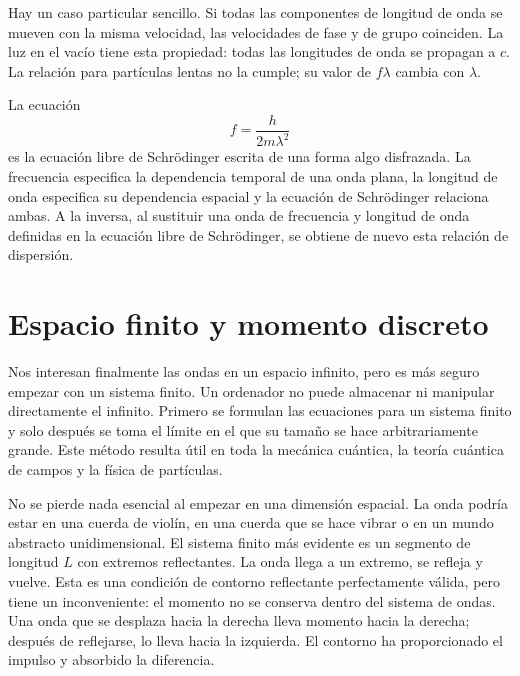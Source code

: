 Hay un caso particular sencillo. Si todas las componentes de longitud de onda se mueven con la misma velocidad, las velocidades de fase y de grupo coinciden. La luz en el vacío tiene esta propiedad: todas las longitudes de onda se propagan a \(c\). La relación para partículas lentas no la cumple; su valor de \(f\lambda\) cambia con \(\lambda\).

La ecuación
\begin{equation}
f=\frac{h}{2m\lambda^2}
\end{equation}
es la ecuación libre de Schr\"odinger escrita de una forma algo disfrazada. La frecuencia especifica la dependencia temporal de una onda plana, la longitud de onda especifica su dependencia espacial y la ecuación de Schr\"odinger relaciona ambas. A la inversa, al sustituir una onda de frecuencia y longitud de onda definidas en la ecuación libre de Schr\"odinger, se obtiene de nuevo esta relación de dispersión.

\begin{classroomqa}
\end{classroomqa}

\section{Espacio finito y momento discreto}

Nos interesan finalmente las ondas en un espacio infinito, pero es más seguro empezar con un sistema finito. Un ordenador no puede almacenar ni manipular directamente el infinito. Primero se formulan las ecuaciones para un sistema finito y solo después se toma el límite en el que su tamaño se hace arbitrariamente grande. Este método resulta útil en toda la mecánica cuántica, la teoría cuántica de campos y la física de partículas.

No se pierde nada esencial al empezar en una dimensión espacial. La onda podría estar en una cuerda de violín, en una cuerda que se hace vibrar o en un mundo abstracto unidimensional. El sistema finito más evidente es un segmento de longitud \(L\) con extremos reflectantes. La onda llega a un extremo, se refleja y vuelve. Esta es una condición de contorno reflectante perfectamente válida, pero tiene un inconveniente: el momento no se conserva dentro del sistema de ondas. Una onda que se desplaza hacia la derecha lleva momento hacia la derecha; después de reflejarse, lo lleva hacia la izquierda. El contorno ha proporcionado el impulso y absorbido la diferencia.

